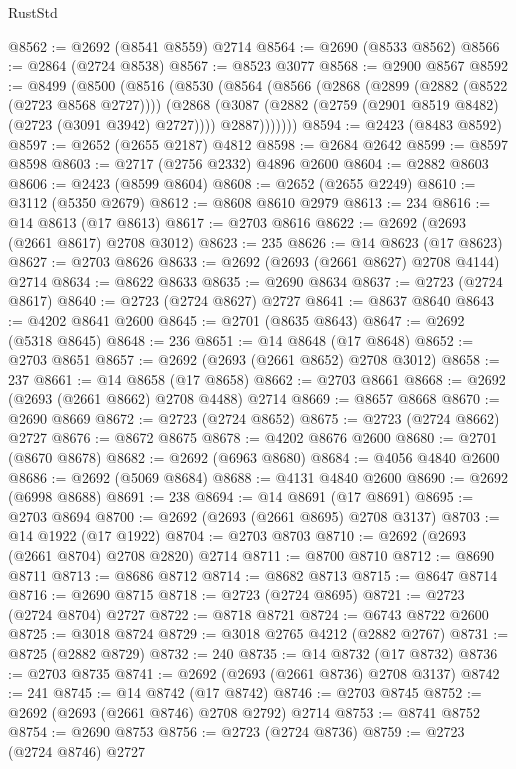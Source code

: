 \begin{lexlean}{RustStd}
\begin{coremodule}
@8562 := @2692 (@8541 @8559) @2714
@8564 := @2690 (@8533 @8562)
@8566 := @2864 (@2724 @8538)
@8567 := @8523 @3077
@8568 := @2900 @8567
@8592 := @8499
    (@8500
      (@8516
        (@8530
          (@8564
            (@8566
              (@2868
                (@2899 (@2882 (@8522 (@2723 @8568 @2727))))
                (@2868
                  (@3087 (@2882 (@2759 (@2901 @8519 @8482) (@2723 (@3091 @3942) @2727))))
                  @2887)))))))
@8594 := @2423 (@8483 @8592)
@8597 := @2652 (@2655 @2187) @4812
@8598 := @2684 @2642
@8599 := @8597 @8598
@8603 := @2717 (@2756 @2332) @4896 @2600
@8604 := @2882 @8603
@8606 := @2423 (@8599 @8604)
@8608 := @2652 (@2655 @2249)
@8610 := @3112 (@5350 @2679)
@8612 := @8608 @8610 @2979
@8613 := 234
@8616 := @14 @8613 (@17 @8613)
@8617 := @2703 @8616
@8622 := @2692 (@2693 (@2661 @8617) @2708 @3012)
@8623 := 235
@8626 := @14 @8623 (@17 @8623)
@8627 := @2703 @8626
@8633 := @2692 (@2693 (@2661 @8627) @2708 @4144) @2714
@8634 := @8622 @8633
@8635 := @2690 @8634
@8637 := @2723 (@2724 @8617)
@8640 := @2723 (@2724 @8627) @2727
@8641 := @8637 @8640
@8643 := @4202 @8641 @2600
@8645 := @2701 (@8635 @8643)
@8647 := @2692 (@5318 @8645)
@8648 := 236
@8651 := @14 @8648 (@17 @8648)
@8652 := @2703 @8651
@8657 := @2692 (@2693 (@2661 @8652) @2708 @3012)
@8658 := 237
@8661 := @14 @8658 (@17 @8658)
@8662 := @2703 @8661
@8668 := @2692 (@2693 (@2661 @8662) @2708 @4488) @2714
@8669 := @8657 @8668
@8670 := @2690 @8669
@8672 := @2723 (@2724 @8652)
@8675 := @2723 (@2724 @8662) @2727
@8676 := @8672 @8675
@8678 := @4202 @8676 @2600
@8680 := @2701 (@8670 @8678)
@8682 := @2692 (@6963 @8680)
@8684 := @4056 @4840 @2600
@8686 := @2692 (@5069 @8684)
@8688 := @4131 @4840 @2600
@8690 := @2692 (@6998 @8688)
@8691 := 238
@8694 := @14 @8691 (@17 @8691)
@8695 := @2703 @8694
@8700 := @2692 (@2693 (@2661 @8695) @2708 @3137)
@8703 := @14 @1922 (@17 @1922)
@8704 := @2703 @8703
@8710 := @2692 (@2693 (@2661 @8704) @2708 @2820) @2714
@8711 := @8700 @8710
@8712 := @8690 @8711
@8713 := @8686 @8712
@8714 := @8682 @8713
@8715 := @8647 @8714
@8716 := @2690 @8715
@8718 := @2723 (@2724 @8695)
@8721 := @2723 (@2724 @8704) @2727
@8722 := @8718 @8721
@8724 := @6743 @8722 @2600
@8725 := @3018 @8724
@8729 := @3018 @2765 @4212 (@2882 @2767)
@8731 := @8725 (@2882 @8729)
@8732 := 240
@8735 := @14 @8732 (@17 @8732)
@8736 := @2703 @8735
@8741 := @2692 (@2693 (@2661 @8736) @2708 @3137)
@8742 := 241
@8745 := @14 @8742 (@17 @8742)
@8746 := @2703 @8745
@8752 := @2692 (@2693 (@2661 @8746) @2708 @2792) @2714
@8753 := @8741 @8752
@8754 := @2690 @8753
@8756 := @2723 (@2724 @8736)
@8759 := @2723 (@2724 @8746) @2727

\end{coremodule}
\end{lexlean}
